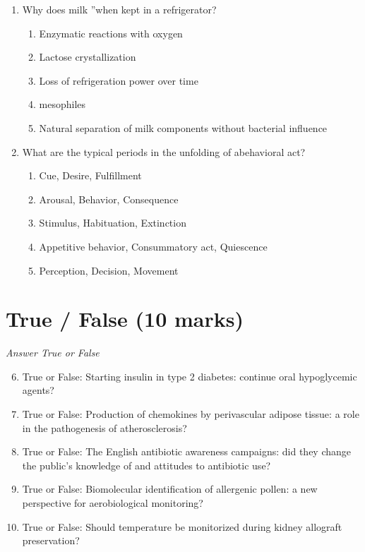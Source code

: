 \documentclass[12pt]{article}
\begin{document}
\begin{enumerate}[label=\arabic*.]
\begin{enumerate}[label=(\alph*)]
    \item methane
    \item nitrogen
    \item sulfur dioxide
    \item neon
\end{enumerate}
\item Why does milk \textquotedblleftspoil\textquotedblright when kept in a refrigerator?
\begin{enumerate}[label=(\alph*)]
    \item Enzymatic reactions with oxygen
    \item Lactose crystallization
    \item Loss of refrigeration power over time
    \item mesophiles
    \item Natural separation of milk components without bacterial influence
\end{enumerate}
\item What are the typical periods in the unfolding of abehavioral act?
\begin{enumerate}[label=(\alph*)]
    \item Cue, Desire, Fulfillment
    \item Arousal, Behavior, Consequence
    \item Stimulus, Habituation, Extinction
    \item Appetitive behavior, Consummatory act, Quiescence
    \item Perception, Decision, Movement
\end{enumerate}
\end{enumerate}

\section*{True / False (10 marks)}
\textit{Answer True or False}
\begin{enumerate}[label=\arabic*.]
\setcounter{enumi}{5}
\item True or False: Starting insulin in type 2 diabetes: continue oral hypoglycemic agents?
\item True or False: Production of chemokines by perivascular adipose tissue: a role in the pathogenesis of atherosclerosis?
\item True or False: The English antibiotic awareness campaigns: did they change the public's knowledge of and attitudes to antibiotic use?
\item True or False: Biomolecular identification of allergenic pollen: a new perspective for aerobiological monitoring?
\item True or False: Should temperature be monitorized during kidney allograft preservation?
\end{enumerate}
\end{document}
